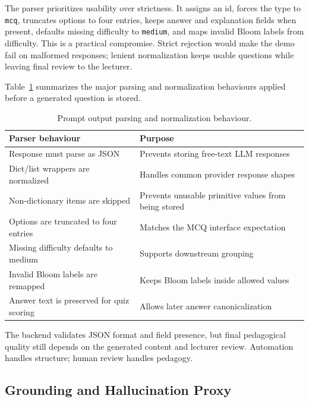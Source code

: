 \documentclass[12pt,a4paper]{article}
\begin{document}
The parser prioritizes usability over strictness. It assigns an id, forces
the type to \texttt{mcq}, truncates options to four entries, keeps answer
and explanation fields when present, defaults missing difficulty to
\texttt{medium}, and maps invalid Bloom labels from difficulty. This is a practical compromise. Strict rejection would make the demo fail on malformed responses;
lenient normalization keeps usable questions while leaving final review
to the lecturer.

Table~\ref{tab:prompt-validation} summarizes the major parsing and
normalization behaviours applied before a generated question is stored.

\begin{table}[H]
  \centering
  \singlespacing
  \caption{Prompt output parsing and normalization behaviour.}
  \label{tab:prompt-validation}
  \small
  \begin{tabular}{@{}p{5.2cm}p{8.2cm}@{}}
    \toprule
    \textbf{Parser behaviour} & \textbf{Purpose} \\
    \midrule
    Response must parse as JSON & Prevents storing free-text LLM responses \\
    Dict/list wrappers are normalized & Handles common provider response shapes \\
    Non-dictionary items are skipped & Prevents unusable primitive values from being stored \\
    Options are truncated to four entries & Matches the MCQ interface expectation \\
    Missing difficulty defaults to medium & Supports downstream grouping \\
    Invalid Bloom labels are remapped & Keeps Bloom labels inside allowed values \\
    Answer text is preserved for quiz scoring & Allows later answer canonicalization \\
    \bottomrule
  \end{tabular}
\end{table}

The backend validates JSON format and field presence, but final
pedagogical quality still depends on the generated content and lecturer
review. Automation handles structure; human review handles pedagogy.

\subsection{Grounding and Hallucination Proxy}
\label{subsec:grounding}
\end{document}
